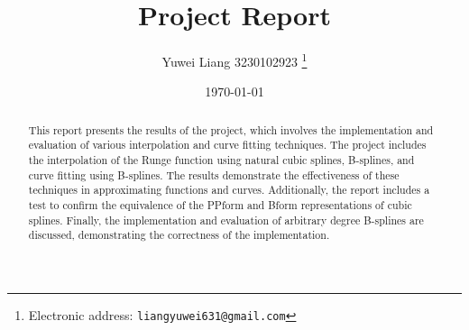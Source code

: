 \documentclass[a4paper]{article}
\begin{document}
\title{Project Report}

\author{Yuwei Liang 3230102923
  \thanks{Electronic address: \texttt{liangyuwei631@gmail.com}}}

\date{\today}

\maketitle

\begin{abstract}
  This report presents the results of the project, which involves the implementation and evaluation of various interpolation and curve fitting techniques. The project includes the interpolation of the Runge function using natural cubic splines, B-splines, and curve fitting using B-splines. The results demonstrate the effectiveness of these techniques in approximating functions and curves. Additionally, the report includes a test to confirm the equivalence of the PPform and Bform representations of cubic splines. Finally, the implementation and evaluation of arbitrary degree B-splines are discussed, demonstrating the correctness of the implementation.
\end{abstract}

\end{document}
